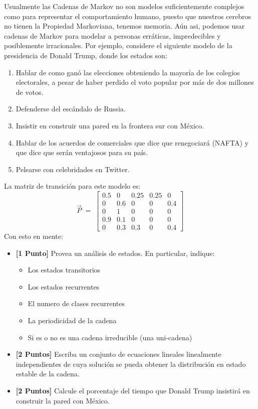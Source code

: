 \documentclass[ a4paper, twoside, 11pt]{article}
\begin{document}
\begin{problem}
Usualmente las Cadenas de Markov no son modelos suficientemente complejos como para representar el comportamiento humano, puesto que nuestros cerebros no tienen la Propiedad Markoviana, \ie tenemos memoria. A\'un asi, podemos usar cadenas de Markov para modelar a personas err\'aticas, impredecibles y posiblemente irracionales. Por ejemplo, considere el siguiente modelo de la presidencia de Donald Trump, donde los estados son: 
\begin{enumerate}
\item Hablar de como gan\'o las elecciones obteniendo la mayor\'ia de los colegios electorales, \linebreak a pesar de haber perdido el voto popular por m\'as de dos millones de votos. 
\item Defenderse del esc\'andalo de Russia. 
\item Insistir en construir una pared en la frontera sur con M\'exico. 
\item Hablar de los acuerdos de comerciales que dice que renegociar\'a (\eg NAFTA) y que dice que ser\'an ventajosos para su pa\'is. 
\item Pelearse con celebridades en Twitter. 
\end{enumerate}
La matriz de transici\'on para este modelo es: 
\[
\vec{P} \; = \; 
\left[
\begin{array}{ccccc}
0.5 & 0 & 0.25 & 0.25 & 0 \\
0 & 0.6 & 0 & 0 & 0.4 \\
0 & 1 & 0 & 0 & 0 \\
0.9 & 0.1 & 0 & 0 & 0 \\
0 & 0.3 & 0.3 & 0 & 0.4
\end{array}
\right]
\]
Con esto en mente: 
\begin{itemize}
\item \textbf{[1 Punto]} Provea un an\'alisis de estados. En particular, indique: 
\begin{itemize}
\item Los estados transitorios
\item Los estados recurrentes
\item El numero de clases recurrentes
\item La periodicidad de la cadena
\item Si es o no es una cadena irreducible (\ie una uni-cadena)
\end{itemize}
\item \textbf{[2 Puntos]} Escriba un conjunto de ecuaciones lineales linealmente independientes de cuya soluci\'on se pueda obtener la distribuci\'on en estado estable de la cadena. 
\item \textbf{[2 Puntos]} Calcule el porcentaje del tiempo que Donald Trump insistir\'a en construir la pared con M\'exico. 
\end{itemize}


\end{problem}
\end{document}
